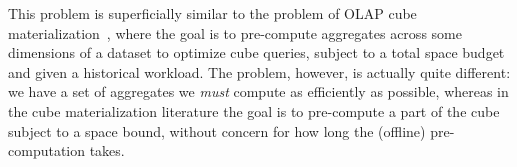 This problem is superficially similar to the problem of OLAP cube materialization~\cite{olap_cube}, where
the goal is to pre-compute aggregates across some dimensions of a dataset to optimize cube queries,
subject to a total space budget and given a historical workload.  The problem, however, is actually quite different:
we have a set of aggregates we {\it must} compute as efficiently as possible, whereas in the cube materialization
literature the goal is to pre-compute a part of the cube subject to a space bound, without concern for how long the 
(offline) pre-computation takes.




